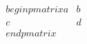 \documentclass[preview]{standalone}
\begin{document}
\begin{align*}
\quad\\begin{pmatrix} a & b \quad\\ c & d \quad\\end{pmatrix}
\end{align*}
\end{document}
